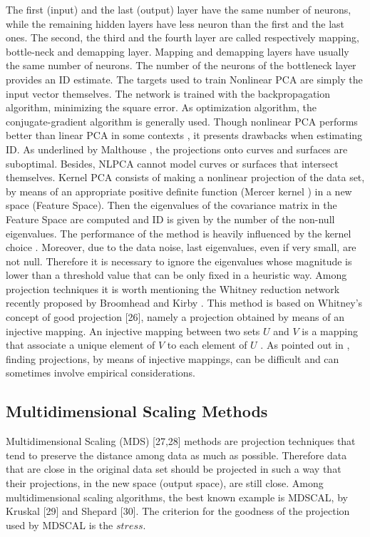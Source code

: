 \documentclass[journal]{IEEEtran}
\begin{document}
The first (input) and the last (output) layer have the same number of neurons, while the 
remaining hidden layers have less neuron than the first and the last ones. 
The second, the third and the fourth layer are called respectively mapping, bottle-neck and demapping layer. 
Mapping and demapping layers have usually the same number of neurons. The number of the neurons of the bottleneck layer 
provides an ID estimate. The targets used to train Nonlinear PCA are simply the input vector themselves. 
The network is trained with the backpropagation algorithm, minimizing the square error. As optimization algorithm, 
the conjugate-gradient algorithm \cite{Vetterling89} is generally used. 
Though nonlinear PCA performs better than linear PCA in some contexts \cite{Fotheringhame97}, it presents drawbacks when estimating ID. 
As underlined by Malthouse \cite{Malthouse98}, the projections onto curves and surfaces are suboptimal. 
Besides, NLPCA cannot model curves or surfaces that intersect themselves. Kernel PCA consists of making a nonlinear projection of the data set, 
by means of an appropriate positive definite function (Mercer kernel ) \cite{Ressel84} in a new space (Feature Space). 
Then the eigenvalues of the covariance matrix in the Feature Space are computed and ID is given by the number of the non-null eigenvalues. 
The performance of the method is heavily influenced by the kernel choice \cite{Camastra02}. 
Moreover, due to the data noise, last eigenvalues, even if very small, are not null. 
Therefore it is necessary to ignore the eigenvalues whose magnitude is lower than a threshold value that can be only fixed in a heuristic way.
Among projection techniques it is worth mentioning the Whitney reduction network recently proposed by Broomhead and Kirby \cite{Kirby01,Kirby2000}. 
This method is based on Whitney’s concept of good projection [26], namely a projection obtained by means of an injective mapping. 
An injective mapping between two sets \(U\) and \(V\) is a mapping that associate a unique element of \(V\) to each element of \(U\) . As
pointed out in \cite{Kirby01}, finding projections, by means of injective mappings, can be difficult and can sometimes involve empirical considerations.

\subsection{Multidimensional Scaling Methods}
Multidimensional Scaling (MDS) [27,28] methods are projection techniques that tend to preserve the distance among data as much as possible. 
Therefore data that are close in the original data set should be projected in such a way that their projections, 
in the new space (output space), are still close. Among multidimensional scaling algorithms, 
the best known example is MDSCAL, by Kruskal [29] and Shepard [30]. The criterion for the goodness of the projection used by MDSCAL is the \(stress\).
\end{document}
